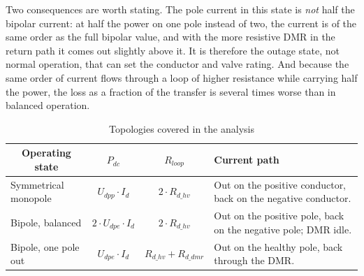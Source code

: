 Two consequences are worth stating. The pole current in this state is
\emph{not} half the bipolar current: at half the power on one pole instead of
two, the current is of the same order as the full bipolar value, and with the
more resistive DMR in the return path it comes out slightly above it. It is
therefore the outage state, not normal operation, that can set the conductor
and valve rating. And because the same order of current flows through a loop of
higher resistance while carrying half the power, the loss as a fraction of the
transfer is several times worse than in balanced operation.

\begin{table}[b]
  \centering
  \renewcommand{\arraystretch}{1.25}
  \begin{tabularx}{\linewidth}{@{}l c c X@{}}
    \toprule
    \multicolumn{1}{c}{\textbf{Operating state}} & \multicolumn{1}{c}{\textbf{$P_{dc}$}} & \multicolumn{1}{c}{\textbf{$R_{loop}$}} &
    \textbf{Current path} \\
    \midrule
    Symmetrical monopole
      & $U_{dpp}\cdot I_{d}$ & $2\cdot R_{d\_hv}$
      & Out on the positive conductor, back on the negative conductor. \\
    Bipole, balanced
      & $2\cdot U_{dpe}\cdot I_{d}$ & $2\cdot R_{d\_hv}$
      & Out on the positive pole, back on the negative pole; DMR idle. \\
    Bipole, one pole out
      & $U_{dpe}\cdot I_{d}$ & $R_{d\_hv} + R_{d\_dmr}$
      & Out on the healthy pole, back through the DMR. \\
    \bottomrule
  \end{tabularx}
  \caption{Topologies covered in the analysis}
  \label{tab:cases}
\end{table}

